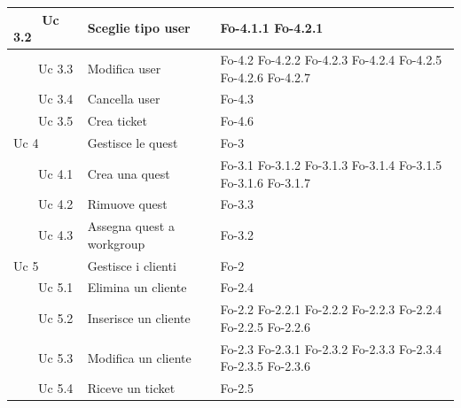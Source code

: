 {{\begin{longtable}{|p{3.5cm}|p{6.5cm}|p{3cm}|}
\hline
\ \ \ \ Uc 3.2 & Sceglie tipo user & Fo-4.1.1 \newline Fo-4.2.1\\
\hline
\ \ \ \ Uc 3.3 & Modifica user & Fo-4.2 \newline Fo-4.2.2 \newline Fo-4.2.3 \newline Fo-4.2.4 \newline Fo-4.2.5 \newline Fo-4.2.6 \newline Fo-4.2.7\\
\hline
\ \ \ \ Uc 3.4 & Cancella user & Fo-4.3\\
\hline
\ \ \ \ Uc 3.5 & Crea ticket & Fo-4.6\\
\hline
Uc 4 & Gestisce le quest & Fo-3\\
\hline
\ \ \ \ Uc 4.1 & Crea una quest & Fo-3.1 \newline Fo-3.1.2 \newline Fo-3.1.3 \newline Fo-3.1.4 \newline Fo-3.1.5 \newline Fo-3.1.6 \newline Fo-3.1.7\\
\hline
\ \ \ \ Uc 4.2 & Rimuove quest & Fo-3.3\\
\hline
\ \ \ \ Uc 4.3 & Assegna quest a workgroup & Fo-3.2\\
\hline
Uc 5 & Gestisce i clienti & Fo-2\\
\hline
\ \ \ \ Uc 5.1 & Elimina un cliente & Fo-2.4\\
\hline
\ \ \ \ Uc 5.2 & Inserisce un cliente & Fo-2.2 \newline Fo-2.2.1 \newline Fo-2.2.2 \newline Fo-2.2.3 \newline Fo-2.2.4 \newline Fo-2.2.5 \newline Fo-2.2.6\\
\hline
\ \ \ \ Uc 5.3 & Modifica un cliente & Fo-2.3 \newline Fo-2.3.1 \newline Fo-2.3.2 \newline Fo-2.3.3 \newline Fo-2.3.4 \newline Fo-2.3.5 \newline Fo-2.3.6 \\
\hline
\ \ \ \ Uc 5.4 & Riceve un ticket & Fo-2.5\\

\end{longtable}}}
